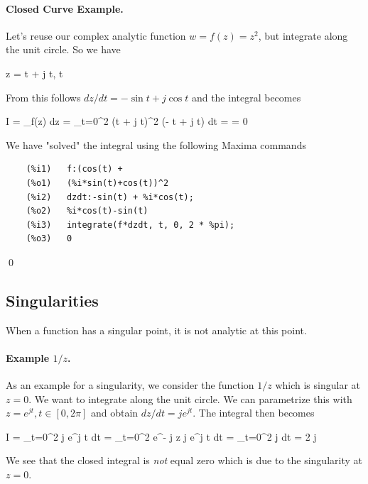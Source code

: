\paragraph{Closed Curve Example.} Let's reuse our complex analytic function $w = f(z) = z^2$, but integrate along the unit circle. So we have

\bee
z = \cos t + j \sin t, \quad t \in [0, 2\pi]
\eee

From this follows $dz/dt = - \sin t + j \cos t$ and the integral becomes

\bee
I = \int_\gamma f(z) dz = \int_{t=0}^{2\pi} (\cos t + j \sin t)^2 (- \sin t + j \cos t) dt = \cdots = 0
\eee

We have "solved" the integral using the following Maxima commands

\begin{verbatim}
    (%i1)	f:(cos(t) +
    (%o1)	(%i*sin(t)+cos(t))^2
    (%i2)	dzdt:-sin(t) + %i*cos(t);
    (%o2)	%i*cos(t)-sin(t)
    (%i3)	integrate(f*dzdt, t, 0, 2 * %pi);
    (%o3)	0
\end{verbatim}

\qed


\subsection{Singularities}

When a function has a singular point, it is not analytic at this point.


\paragraph{Example $1/z$.} As an example for a singularity, we consider the function $1/z$ which is singular at $z=0$. We want to integrate along the unit circle. We can parametrize this with $z = e^{j t}, t \in [0, 2 \pi]$ and obtain $dz/dt = j e^{j t}$. The integral then becomes

\bee
I = \int_{t=0}^{2 \pi}  j e^{j t} dt = \int_{t=0}^{2 \pi} e^{- j z} j e^{j t} dt = \int_{t=0}^{2 \pi} j  dt = 2 \pi j
\eee

We see that the closed integral is \emph{not} equal zero which is due to the singularity at $z=0$.

